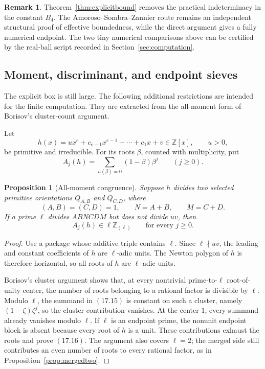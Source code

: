 \documentclass[11pt]{article}
\newtheorem{proposition}[theorem]{Proposition}
\theoremstyle{definition}
\newtheorem{remark}[theorem]{Remark}
\newcommand{\Z}{\mathbb Z}
\begin{document}
\begin{remark}
Theorem~\ref{thm:explicitbound} removes the practical indeterminacy in the
constant \(B_4\).  The Amoroso--Sombra--Zannier route remains an independent
structural proof of effective boundedness, while the direct argument gives a
fully numerical endpoint.  The two tiny numerical comparisons above can be
certified by the real-ball script recorded in
Section~\ref{sec:computation}.
\end{remark}

\subsection{Moment, discriminant, and endpoint sieves}
\label{subsec:momentsieves}

The explicit box is still large.  The following additional restrictions are
intended for the finite computation.  They are extracted from the all-moment
form of Borisov's cluster-count argument.

Let
\[
 h(x)=ux^e+c_{e-1}x^{e-1}+\cdots+c_1x+v\in\Z[x],
 \qquad u>0,
\]
be primitive and irreducible.  For its roots \(\beta\), counted with
multiplicity, put
\begin{equation}
 A_j(h)=\sum_{h(\beta)=0}(1-\beta)\beta^j
 \qquad(j\geq0).
 \tag{17.15}
\end{equation}

\begin{proposition}[All-moment congruence]\label{prop:momentcongruence}
Suppose \(h\) divides two selected primitive orientations
\(Q_{A,B}\) and \(Q_{C,D}\), where
\[
 (A,B)=(C,D)=1,
 \qquad N=A+B,
 \qquad M=C+D.
\]
If a prime \(\ell\) divides \(ABNCDM\) but does not divide \(uv\), then
\begin{equation}
 A_j(h)\in\ell\Z_{(\ell)}
 \qquad\text{for every }j\geq0.
 \tag{17.16}
\end{equation}
\end{proposition}

\begin{proof}
Use a package whose additive triple contains \(\ell\).  Since
\(\ell\nmid uv\), the leading and constant coefficients of \(h\) are
\(\ell\)-adic units.  The Newton polygon of \(h\) is therefore horizontal,
so all roots of \(h\) are \(\ell\)-adic units.

Borisov's cluster argument \cite[Lemma~3.1 and Remark~3.5]{Borisov1998}
shows that, at every nontrivial prime-to-\(\ell\) root-of-unity center, the
number of roots belonging to a rational factor is divisible by \(\ell\).
Modulo \(\ell\), the summand in \((17.15)\) is constant on such a cluster,
namely \((1-\zeta)\zeta^j\), so the cluster contribution vanishes.  At the
center \(1\), every summand already vanishes modulo \(\ell\).  If \(\ell\)
is an endpoint prime, the nonunit endpoint block is absent because every root
of \(h\) is a unit.  These contributions exhaust the roots and prove
\((17.16)\).  The argument also covers \(\ell=2\); the merged side still
contributes an even number of roots to every rational factor, as in
Proposition~\ref{prop:mergedtwo}.
\end{proof}
\end{document}
